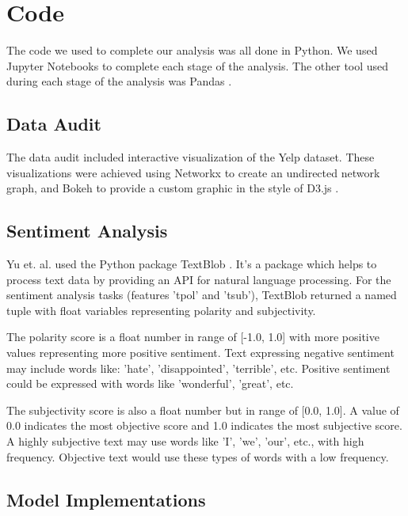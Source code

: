 \documentclass[12pt]{article}
\begin{document}
\section{Code}

The code we used to complete our analysis was all done in Python. We used Jupyter Notebooks
\cite{ProjectJ85:online} to complete each stage of the analysis. The other tool used during
each stage of the analysis was Pandas \cite{PythonDa47:online}.

\subsection{Data Audit}

The data audit included interactive visualization of the Yelp dataset. These visualizations
were achieved using Networkx \cite{NetworkX32:online} to create an undirected network graph,
and Bokeh \cite{Welcomet73:online}  to provide a custom graphic in the style of D3.js
\cite{D3jsData97:online}. 

\subsection{Sentiment Analysis}

Yu et. al. \cite{yu2015restaurants} used the Python package TextBlob \cite{TextBlob35:online}.
It's a package which helps to process text data by providing an API for natural language
processing. For the sentiment analysis tasks (features 'tpol' and 'tsub'), TextBlob returned
a named tuple with float variables representing polarity and subjectivity.

The polarity score is a float number in range of [-1.0, 1.0] with more positive values
representing more positive sentiment. Text expressing negative sentiment may include words
like: 'hate', 'disappointed', 'terrible', etc. Positive sentiment could be expressed with
words like 'wonderful', 'great', etc.

The subjectivity score is also a float number but in range of [0.0, 1.0]. A value of 0.0
indicates the most objective score and 1.0 indicates the most subjective score. A highly
subjective text may use words like 'I', 'we', 'our', etc., with high frequency. Objective
text would use these types of words with a low frequency.

\subsection{Model Implementations}
\end{document}
